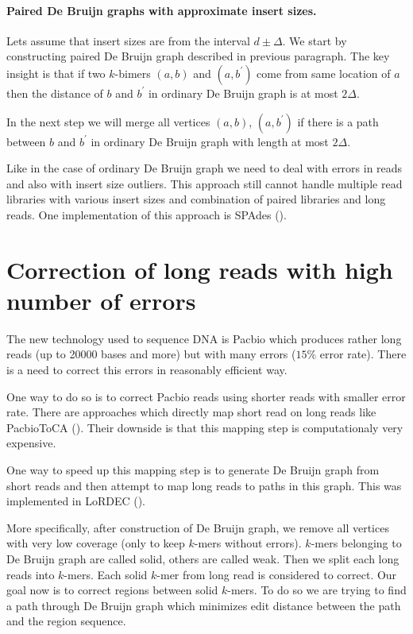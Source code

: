 \paragraph{Paired De Bruijn graphs with approximate insert sizes.}
Lets assume that insert sizes are from the interval $d \pm \Delta$.
We start by constructing paired De Bruijn graph described in previous paragraph.
The key insight is that if two $k$-bimers $(a, b)$ and $(a, b^{'})$ come from
same location of $a$ then the distance of $b$ and $b^{'}$ in ordinary De Bruijn graph is at most $2\Delta$.

In the next step we will merge all vertices $(a, b)$, $(a, b^{'})$ if there is a path
between $b$ and $b^{'}$ in ordinary De Bruijn graph with length at most $2\Delta$.

\bigskip
Like in the case of ordinary De Bruijn graph we need to deal with errors in reads
and also with insert size outliers. This approach still cannot handle multiple
read libraries with various insert sizes and combination of paired libraries and long reads.
One implementation of this approach is SPAdes (\cite{Spades}).


\section{Correction of long reads with high number of errors}

The new technology used to sequence DNA is Pacbio which produces
rather long reads (up to 20000 bases and more) but with many errors
($15\%$ error rate). There is a need to correct this errors in reasonably
efficient way.

One way to do so is to correct Pacbio reads using shorter reads with smaller
error rate. There are approaches which directly map short read on long reads like
PacbioToCA (\cite{PacbioToCA}). Their downside is that this mapping step
is computationaly very expensive.

One way to speed up this mapping step is to generate De Bruijn graph from short reads
and then attempt to map long reads to paths in this graph. This was implemented
in LoRDEC (\cite{Lordec}).

More specifically, after construction of De Bruijn graph, we remove all vertices
with very low coverage (only to keep $k$-mers without errors). $k$-mers belonging
to De Bruijn graph are called solid, others are called weak.
Then we split each long reads into $k$-mers. Each solid $k$-mer from long read is considered to correct. 
Our goal now is to correct regions between solid $k$-mers. To do so we are trying
to find a path through De Bruijn graph which minimizes edit distance between the path
and the region sequence. 

